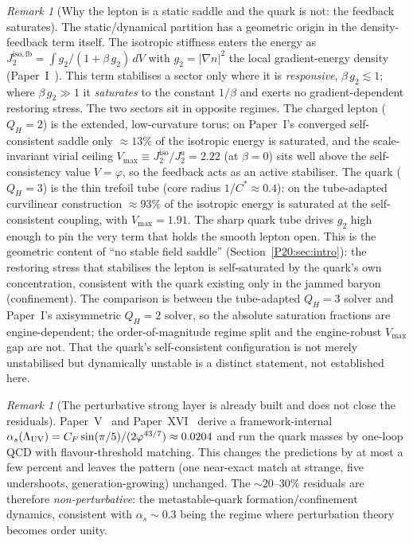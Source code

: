 \documentclass[11pt,a4paper]{article}
\theoremstyle{definition}\newtheorem{definition}[theorem]{Definition}
\theoremstyle{remark}
\newtheorem{remark}[theorem]{Remark}
\newcommand{\vp}{\varphi}
\newcommand{\QH}{Q_H}
\newcommand{\alphas}{\alpha_s}
\begin{document}
\begin{remark}[Why the lepton is a static saddle and the quark is not: the feedback saturates]
\label{P20:rem:feedback_saturation}
The static/dynamical partition has a geometric origin in the
density-feedback term itself. The isotropic stiffness enters the energy
as $J_2^{\mathrm{iso,fb}}=\int g_2/(1+\beta\,g_2)\,dV$ with
$g_2=|\nabla n|^2$ the local gradient-energy density (Paper~I~\cite{Paper1}).
This term stabilises a sector only where it is \emph{responsive},
$\beta\,g_2\lesssim1$; where $\beta\,g_2\gg1$ it \emph{saturates} to the
constant $1/\beta$ and exerts no gradient-dependent restoring stress. The
two sectors sit in opposite regimes. The charged lepton ($\QH=2$) is the
extended, low-curvature torus: on Paper~I's converged self-consistent
saddle only $\approx13\%$ of the isotropic energy is saturated, and the
scale-invariant virial ceiling
$V_{\max}\equiv J_2^{\mathrm{iso}}/J_2^{a}=2.22$ (at $\beta=0$) sits well
above the self-consistency value $V=\vp$, so the feedback acts as an
active stabiliser. The quark ($\QH=3$) is the thin trefoil tube (core
radius $1/C^\ast\!\approx\!0.4$): on the tube-adapted curvilinear
construction $\approx93\%$ of the isotropic energy is saturated at the
self-consistent coupling, with $V_{\max}=1.91$. The sharp quark tube
drives $g_2$ high enough to pin the very term that holds the smooth
lepton open. This is the geometric content of ``no stable field saddle''
(Section~\ref{P20:sec:intro}): the restoring stress that stabilises the
lepton is self-saturated by the quark's own concentration, consistent
with the quark existing only in the jammed baryon (confinement). The
comparison is between the tube-adapted $\QH=3$ solver and Paper~I's
axisymmetric $\QH=2$ solver, so the absolute saturation fractions are
engine-dependent; the order-of-magnitude regime split and the
engine-robust $V_{\max}$ gap are not. That the quark's self-consistent
configuration is not merely unstabilised but dynamically unstable is a
distinct statement, not established here.
\end{remark}

\begin{remark}[The perturbative strong layer is already built and does not close the residuals]
\label{P20:rem:perturbative}
Paper~V~\cite{Paper5} and Paper~XVI~\cite{Paper16} derive a
framework-internal $\alphas(\Lambda_{\rm UV})=C_F\sin(\pi/5)/(2\vp^{43/7})
\approx0.0204$ and run the quark masses by one-loop QCD with
flavour-threshold matching. This changes the predictions by at most a few
percent and leaves the pattern (one near-exact match at strange, five
undershoots, generation-growing) unchanged. The $\sim20$--$30\%$
residuals are therefore \emph{non-perturbative}: the metastable-quark
formation/confinement dynamics, consistent with $\alphas\sim0.3$ being
the regime where perturbation theory becomes order unity.
\end{remark}
\end{document}
